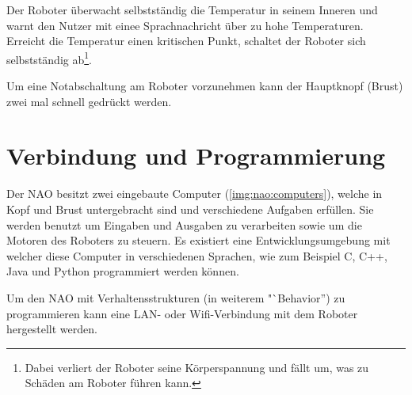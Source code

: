         Der Roboter überwacht selbstständig die Temperatur in seinem Inneren und
        warnt den Nutzer mit einee Sprachnachricht über zu hohe Temperaturen.
        Erreicht die Temperatur einen kritischen Punkt, schaltet der Roboter
        sich selbstständig ab\footnote{Dabei verliert der Roboter seine
            Körperspannung und fällt um, was zu Schäden am Roboter führen
            kann.
        }.

        Um eine Notabschaltung am Roboter vorzunehmen kann der Hauptknopf
        (Brust) zwei mal schnell gedrückt werden.

    \section{Verbindung und Programmierung}

        Der NAO besitzt zwei eingebaute Computer (\autoref{img:nao:computers}),
        welche in Kopf und Brust
        untergebracht sind und verschiedene Aufgaben erfüllen.
        Sie werden benutzt um Eingaben und Ausgaben zu verarbeiten sowie um die
        Motoren des Roboters zu steuern.
        Es existiert eine Entwicklungsumgebung mit welcher diese Computer in
        verschiedenen Sprachen, wie zum Beispiel C, C++, Java und Python
        programmiert werden können.

        Um den NAO mit Verhaltensstrukturen (in weiterem "`Behavior'') zu
        programmieren kann eine \ac{LAN}- oder \ac{Wifi}-Verbindung mit dem
        Roboter hergestellt werden.


